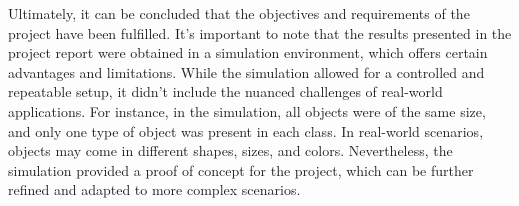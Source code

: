Ultimately, it can be concluded that the objectives and requirements of the project have been fulfilled. It's important to note that the results presented in the project report were obtained in a simulation environment, which offers certain advantages and limitations. While the simulation allowed for a controlled and repeatable setup, it didn't include the nuanced challenges of real-world applications. For instance, in the simulation, all objects were of the same size, and only one type of object was present in each class. In real-world scenarios, objects may come in different shapes, sizes, and colors. Nevertheless, the simulation provided a proof of concept for the project, which can be further refined and adapted to more complex scenarios.